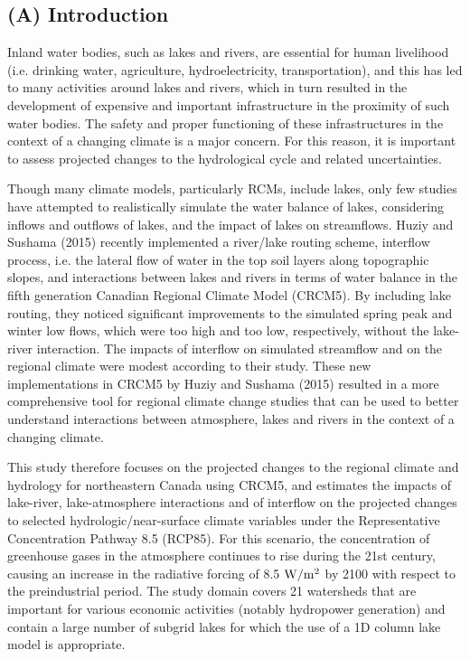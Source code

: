 \documentclass[a0,landscape]{a0poster}
\begin{document}
\begin{multicols*}{3}

\color{SaddleBrown} %

\section*{(A) Introduction}
Inland water bodies, such as lakes and rivers, are essential for human
livelihood (i.e. drinking water, agriculture, hydroelectricity, transportation),
and this has led to many activities around lakes and rivers, which in turn
resulted in the development of expensive and important infrastructure in the
proximity of such water bodies. The safety and proper functioning of these
infrastructures in the context of a changing climate is a major concern. For
this reason, it is important to assess projected changes to the hydrological
cycle and related uncertainties.

Though many climate models, particularly RCMs, include lakes, only few studies
have attempted to realistically simulate the water balance of lakes, considering
inflows and outflows of lakes, and the impact of lakes on streamflows. Huziy and
Sushama (2015) recently implemented a river/lake routing scheme, interflow
process, i.e. the lateral flow of water in the top soil layers along topographic
slopes, and interactions between lakes and rivers in terms of water balance in
the fifth generation Canadian Regional Climate Model (CRCM5). By including lake
routing, they noticed significant improvements to the simulated spring peak and
winter low flows, which were too high and too low, respectively, without the
lake-river interaction. The impacts of interflow on simulated streamflow and on
the regional climate were modest according to their study. These new
implementations in CRCM5 by Huziy and Sushama (2015) resulted in a more
comprehensive tool for regional climate change studies that can be used to
better understand interactions between atmosphere, lakes and rivers in the
context of a changing climate.

This study therefore focuses on the projected changes to the regional climate
and hydrology for northeastern Canada using CRCM5, and estimates the
impacts of lake-river, lake-atmosphere interactions and of interflow on the
projected changes to selected hydrologic/near-surface climate variables under
the Representative Concentration Pathway 8.5 (RCP85). For this scenario, the
concentration of greenhouse gases in the atmosphere continues to rise during the
21st century, causing an increase in the radiative forcing of 8.5 ${\rm W/m^2}$ by 2100
with respect to the preindustrial period. The study domain covers 21
watersheds that are important for various economic activities (notably
hydropower generation) and contain a large number of subgrid lakes for which the
use of a 1D column lake model is appropriate.


\end{multicols*}
\end{document}
